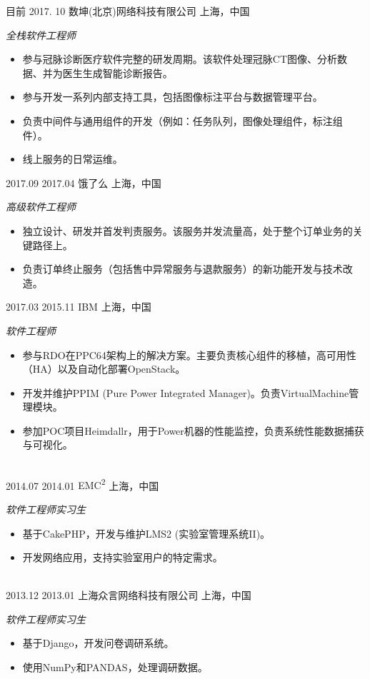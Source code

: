 \documentclass[]{friggeri-cv-cn} %
\begin{document}
\begin{entrylist}
\entry
	{目前}
	{2017. 10}
	{数坤(北京)网络科技有限公司}
	{上海，中国}
	{\emph{全栈软件工程师}
		\begin{itemize}
			\item 参与冠脉诊断医疗软件完整的研发周期。该软件处理冠脉CT图像、分析数据、并为医生生成智能诊断报告。
			\item 参与开发一系列内部支持工具，包括图像标注平台与数据管理平台。
			\item 负责中间件与通用组件的开发（例如：任务队列，图像处理组件，标注组件）。
			\item 线上服务的日常运维。
		\end{itemize}
	}
\entry
	{2017.09}
	{2017.04}
	{饿了么}
	{上海，中国}
	{\emph{高级软件工程师}
		\begin{itemize}
			\item 独立设计、研发并首发判责服务。该服务并发流量高，处于整个订单业务的关键路径上。
			\item 负责订单终止服务（包括售中异常服务与退款服务）的新功能开发与技术改造。
		\end{itemize}
	}
\entry
	{2017.03}
	{2015.11}
	{IBM}
	{上海，中国}
	{\emph{软件工程师}
		\begin{itemize}
		   \item 参与RDO在PPC64架构上的解决方案。主要负责核心组件的移植，高可用性（HA）以及自动化部署OpenStack。
			\item 开发并维护PPIM (Pure Power Integrated Manager)。负责VirtualMachine管理模块。
			\item 参加POC项目Heimdallr，用于Power机器的性能监控，负责系统性能数据捕获与可视化。
		\end{itemize}
	}
\\
	\entry
	{2014.07}
	{2014.01}
	{EMC\textsuperscript{2}}
	{上海，中国}
	{\emph{软件工程师实习生}
		\begin{itemize}
			\item 基于CakePHP，开发与维护LMS2 (实验室管理系统II)。
			\item 开发网络应用，支持实验室用户的特定需求。
		\end{itemize}
	}
\\
	\entry
	{2013.12}
	{2013.01}
	{上海众言网络科技有限公司}
	{上海，中国}
	{\emph{软件工程师实习生}
		\begin{itemize}
			\item 基于Django，开发问卷调研系统。
			\item 使用NumPy和PANDAS，处理调研数据。
		\end{itemize}
	}
\end{entrylist}
\end{document}

